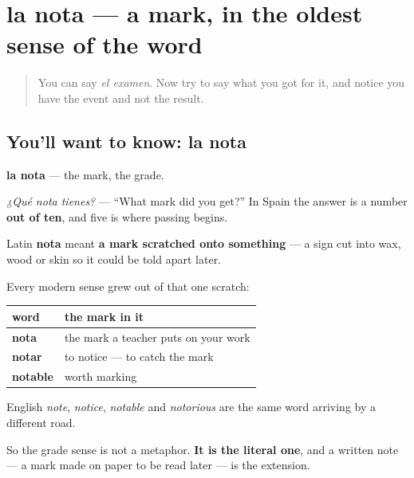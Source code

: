 \section[la nota]{la nota — a mark, in the oldest sense of the word}

\label{lesson:ES-C429-nota}



\begin{quote}
You can say \emph{el examen}. Now try to say what you got for it, and notice you have the event and not the result.
\end{quote}

\subsection*{You'll want to know: la nota}
\textbf{la nota} — the mark, the grade.

\emph{¿Qué nota tienes?} — \textquotedblleft{}What mark did you get?\textquotedblright{} In Spain the answer is a number \textbf{out of ten}, and five is where passing begins.

\begin{cousinweb}
Latin \textbf{nota} meant \textbf{a mark scratched onto something} — a sign cut into wax, wood or skin so it could be told apart later.

Every modern sense grew out of that one scratch:

\noindent
\begin{tabularx}{\linewidth}{@{}>{\raggedright\arraybackslash}X>{\raggedright\arraybackslash}X@{}}
\toprule
\textbf{word} & \textbf{the mark in it} \\
\midrule
\textbf{nota} & the mark a teacher puts on your work \\
\textbf{notar} & to notice — to catch the mark \\
\textbf{notable} & worth marking \\
\bottomrule
\end{tabularx}

English \emph{note}, \emph{notice}, \emph{notable} and \emph{notorious} are the same word arriving by a different road.

So the grade sense is not a metaphor. \textbf{It is the literal one}, and a written note — a mark made on paper to be read later — is the extension.
\end{cousinweb}


